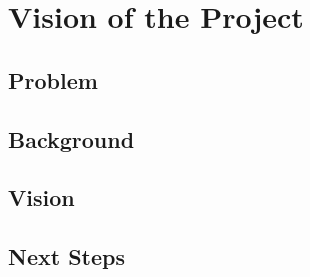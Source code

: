 \section{Vision of the Project}


\subsection{Problem}
\subsection{Background}
\subsection{Vision}
\subsection{Next Steps}